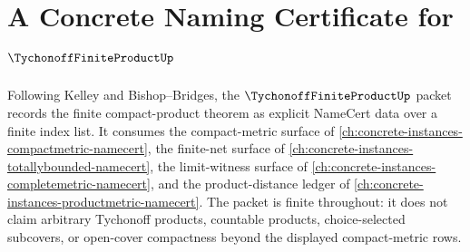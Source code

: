 \chapter{A Concrete Naming Certificate for $\TychonoffFiniteProductUp$}
\label{ch:concrete-instances-tychonoff-finite-product-namecert}

Following Kelley and Bishop--Bridges, the $\TychonoffFiniteProductUp$ packet records the finite compact-product theorem as explicit NameCert data over a finite index list. It consumes the compact-metric surface of \autoref{ch:concrete-instances-compactmetric-namecert}, the finite-net surface of \autoref{ch:concrete-instances-totallybounded-namecert}, the limit-witness surface of \autoref{ch:concrete-instances-completemetric-namecert}, and the product-distance ledger of \autoref{ch:concrete-instances-productmetric-namecert}. The packet is finite throughout: it does not claim arbitrary Tychonoff products, countable products, choice-selected subcovers, or open-cover compactness beyond the displayed compact-metric rows.

